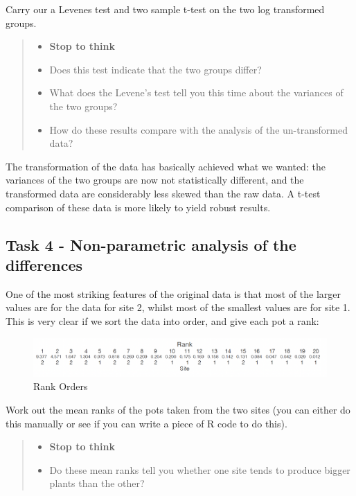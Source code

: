 \documentclass[
]{book}
\providecommand{\tightlist}{%
  \setlength{\itemsep}{0pt}\setlength{\parskip}{0pt}}
\begin{document}
Carry our a Levenes test and two sample t-test on the two log transformed groups.

\begin{quote}
\begin{itemize}
\tightlist
\item
  \textbf{Stop to think}
\item
  Does this test indicate that the two groups differ?
\item
  What does the Levene's test tell you this time about the variances of the two groups?
\item
  How do these results compare with the analysis of the un-transformed data?
\end{itemize}
\end{quote}

The transformation of the data has basically achieved what we wanted: the variances of the two groups are now not statistically different, and the transformed data are considerably less skewed than the raw data. A t-test comparison of these data is more likely to yield robust results.

\subsection{Task 4 - Non-parametric analysis of the differences}\label{task-4---non-parametric-analysis-of-the-differences}

One of the most striking features of the original data is that most of the larger values are for the data for site 2, whilst most of the smallest values are for site 1. This is very clear if we sort the data into order, and give each pot a rank:

\begin{figure}
\includegraphics[width=0.9\linewidth]{figures/ranks} \caption{Rank Orders}\label{fig:unnamed-chunk-70}
\end{figure}

Work out the mean ranks of the pots taken from the two sites (you can either do this manually or see if you can write a piece of R code to do this).

\begin{quote}
\begin{itemize}
\tightlist
\item
  \textbf{Stop to think}
\item
  Do these mean ranks tell you whether one site tends to produce bigger plants than the other?
\end{itemize}
\end{quote}
\end{document}
